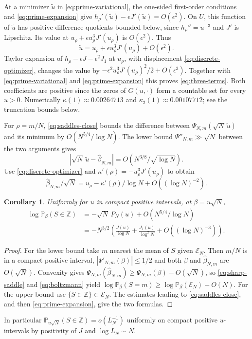 \documentclass[11pt]{amsart}
\newtheorem{corollary}[theorem]{Corollary}
\theoremstyle{remark}
\newcommand{\Pp}{\mathbb P}
\newcommand{\Z}{\mathbb Z}
\begin{document}
At a minimizer \(\widetilde u\) in \eqref{eq:prime-variational}, the
one-sided first-order conditions and \eqref{eq:prime-expansion} give
\(h_\rho'(\widetilde u)-\epsilon J'(\widetilde u)=O(\epsilon^2)\).
On \(U\), this function of \(\widetilde u\) has positive difference
quotients bounded below, since \(h_\rho''=u^{-3}\) and \(J'\)
is Lipschitz. Its value at \(u_\rho+\epsilon u_\rho^3J'(u_\rho)\)
is \(O(\epsilon^2)\). Thus
\begin{equation}\label{eq:discrete-optimizer}
 \widetilde u=u_\rho+\epsilon u_\rho^3J'(u_\rho)+O(\epsilon^2).
\end{equation}
Taylor expansion of \(h_\rho-\epsilon J-\epsilon^2 J_1\) at \(u_\rho\),
with displacement \eqref{eq:discrete-optimizer}, changes the value by
\(-\epsilon^2u_\rho^3J'(u_\rho)^2/2+O(\epsilon^3)\).
Together with \eqref{eq:prime-variational} and
\eqref{eq:prime-expansion} this proves \eqref{eq:three-terms}.
Both coefficients are positive since the zeros of \(G(u,\cdot)\)
form a countable set for every \(u>0\). Numerically
\(\kappa(1)\approx0.00264713\) and \(\kappa_2(1)\approx0.00107712\);
see the truncation bounds below.

For \(\rho=m/N\), \eqref{eq:saddles-close} bounds the difference between
\(\Psi_{N,m}(\sqrt N\,\widetilde u)\) and its minimum by
\(O(N^{5/4}/\log N)\). The lower bound \(\Psi''_{N,m}\gg\sqrt N\) between
the two arguments gives
\[
 |\sqrt N\,\widetilde u-\widehat\beta_{N,m}|
     =O(N^{3/8}/\sqrt{\log N}).
\]
Use \eqref{eq:discrete-optimizer} and
\(\kappa'(\rho)=-u_\rho^3J'(u_\rho)\) to obtain
\begin{equation}\label{eq:saddle-expansion}
 \widehat\beta_{N,m}/\sqrt N=u_\rho-\kappa'(\rho)/\log N
                               +O((\log N)^{-2}).
\end{equation}

\begin{corollary}\label{cor:integer-total}
Uniformly for \(u\) in compact positive intervals, at \(\beta=u\sqrt N\),
\begin{align*}
 \log\Pp_\beta(S\in\Z)&=-\sqrt N\,P_N(u)+O(N^{5/4}/\log N)\\
 &=-N^{3/2}\left(\frac{J(u)}{\log N}+\frac{J_1(u)}{\log^2 N}
                     +O((\log N)^{-3})\right).
\end{align*}
\end{corollary}
\begin{proof}
For the lower bound take \(m\) nearest the mean of \(S\) given
\(\mathcal E_N\). Then \(m/N\) is in a compact positive interval,
\(|\Psi'_{N,m}(\beta)|\le1/2\) and both \(\beta\) and
\(\widehat\beta_{N,m}\) are \(O(\sqrt N)\).
Convexity gives \(\Psi_{N,m}(\widehat\beta_{N,m})
\ge\Psi_{N,m}(\beta)-O(\sqrt N)\), so \eqref{eq:sharp-saddle} and
\eqref{eq:boltzmann} yield
\(\log\Pp_\beta(S=m)\ge\log\Pp_\beta(\mathcal E_N)-O(N)\).
For the upper bound use \(\{S\in\Z\}\subset\mathcal E_N\).
The estimates leading to \eqref{eq:saddles-close}, and then
\eqref{eq:prime-expansion}, give the two formulas.
\end{proof}
In particular \(\mathbb P_{u\sqrt N}(S\in\mathbb Z)=o(L_N^{-1})\)
uniformly on compact positive \(u\)-intervals by positivity of \(J\)
and \(\log L_N\sim N\).
\end{document}
